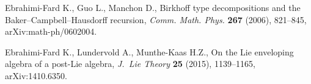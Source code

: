 
Ebrahimi-Fard K., Guo L., Manchon D., Birkhoff type decompositions and the
 {B}aker--{C}ampbell--{H}ausdorff recursion, \textit{Comm. Math. Phys.}
 \textbf{267} (2006), 821--845, arXiv:math-ph/0602004.


Ebrahimi-Fard K., Lundervold A., Munthe-Kaas H.Z., On the {L}ie enveloping
 algebra of a post-{L}ie algebra, \textit{J.~Lie Theory} \textbf{25} (2015),
 1139--1165, arXiv:1410.6350.

